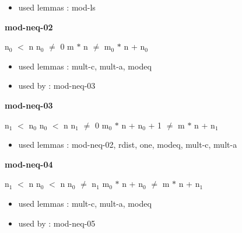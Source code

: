 \documentclass[a4paper]{article}
\begin{document}
\begin{itemize}


\item       used lemmas  : mod-ls

\end{itemize}

\medskip

\bigskip

{\large\bf mod-neq-02}

\medskip

 \Fol $\mbox{n}_{0}$ $<$ n \And $\mbox{n}_{0}$ $\neq$ 0 \Imp m $*$ n $\neq$ $\mbox{m}_{0}$ $*$ n + $\mbox{n}_{0}$

\begin{itemize}


\item       used lemmas  : mult-c, mult-a, modeq
\item       used by      : mod-neq-03

\end{itemize}

\medskip

\bigskip

{\large\bf mod-neq-03}

\medskip

 \Fol $\mbox{n}_{1}$ $<$ $\mbox{n}_{0}$ \And $\mbox{n}_{0}$ $<$ n \And $\mbox{n}_{1}$ $\neq$ 0 \Imp $\mbox{m}_{0}$ $*$ n + $\mbox{n}_{0}$ + 1 $\neq$ m $*$ n + $\mbox{n}_{1}$

\begin{itemize}


\item       used lemmas  : mod-neq-02, rdist, one, modeq, mult-c, mult-a

\end{itemize}

\medskip

\bigskip

{\large\bf mod-neq-04}

\medskip

 \Fol $\mbox{n}_{1}$ $<$ n \And $\mbox{n}_{0}$ $<$ n \And $\mbox{n}_{0}$ $\neq$ $\mbox{n}_{1}$ \Imp $\mbox{m}_{0}$ $*$ n + $\mbox{n}_{0}$ $\neq$ m $*$ n + $\mbox{n}_{1}$

\begin{itemize}


\item       used lemmas  : mult-c, mult-a, modeq
\item       used by      : mod-neq-05

\end{itemize}
\end{document}
